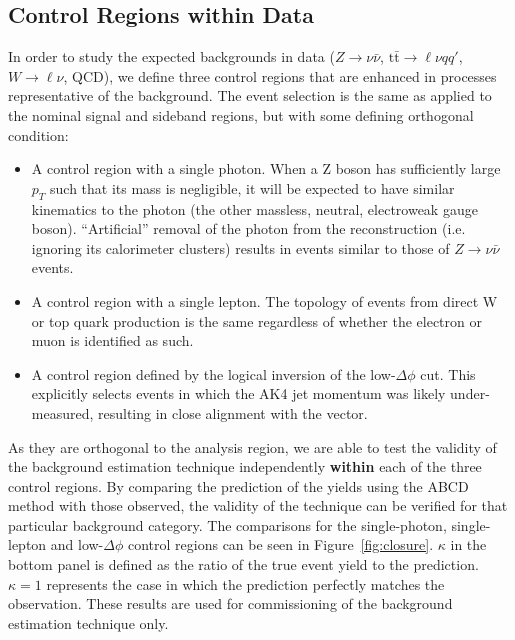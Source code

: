 \subsection{Control Regions within Data}
\label{sec:smbkg}


In order to study the expected backgrounds in data ($Z\rightarrow\nu\bar{\nu}$, $\mathrm{t}\bar{\mathrm{t}} \rightarrow \ell \nu q q'$, $W\rightarrow\ell\nu$, QCD), we define three control regions that are enhanced in processes representative of the background. The event selection is the same as applied to the nominal signal and sideband regions, but with some defining orthogonal condition:

\begin{itemize}

\item A control region with a single photon. When a Z boson has sufficiently large $p_{T}$ such that its mass is negligible, it will be expected to have similar kinematics to the photon (the other massless, neutral, electroweak gauge boson). ``Artificial'' removal of the photon from the reconstruction (i.e. ignoring its calorimeter clusters) results in events similar to those of $Z\rightarrow\nu\bar{\nu}$ events.

\item A control region with a single lepton. The topology of events from direct W or top quark production is the same regardless of whether the electron or muon is identified as such. 

\item A control region defined by the logical inversion of the low-$\Delta\phi$ cut. This explicitly selects events in which the AK4 jet momentum was likely under-measured, resulting in close alignment with the \ptmiss vector.

\end{itemize}

As they are orthogonal to the analysis region, we are able to test the validity of the background estimation technique independently \textbf{within} each of the three control regions. By comparing the prediction of the yields using the ABCD method with those observed, the validity of the technique can be verified for that particular background category. The comparisons for the single-photon, single-lepton and low-$\Delta\phi$ control regions can be seen in Figure~\ref{fig:closure}. $\kappa$ in the bottom panel is defined as the ratio of the true event yield to the prediction. $\kappa=1$ represents the case in which the prediction perfectly matches the observation. These results are used for commissioning of the background estimation technique only.

